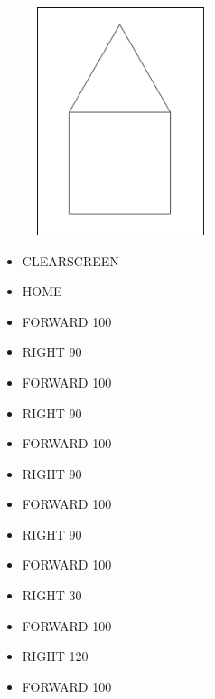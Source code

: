 \begin{minipage}{0.5\textwidth}
\begin{figure}[H]
   \includegraphics[width=5.0cm,trim=4 4 8 4,clip]{./images/marta/mar-1.png}
   \label{mar-1}
\end{figure}
\end{minipage} \hfill
\begin{minipage}{0.45\textwidth}
\begin{itemize}[itemsep=-3pt,parsep=2pt]
\item[] \hspace{0.5cm} CLEARSCREEN
\item[] \hspace{0.5cm} HOME 
\item[] \hspace{0.5cm} FORWARD 100
\item[] \hspace{0.5cm} RIGHT 90
\item[] \hspace{0.5cm} FORWARD 100
\item[] \hspace{0.5cm} RIGHT 90
\item[] \hspace{0.5cm} FORWARD 100
\item[] \hspace{0.5cm} RIGHT 90
\item[] \hspace{0.5cm} FORWARD 100
\item[] \hspace{0.5cm} RIGHT 90
\item[] \hspace{0.5cm} FORWARD 100
\item[] \hspace{0.5cm} RIGHT 30
\item[] \hspace{0.5cm} FORWARD 100
\item[] \hspace{0.5cm} RIGHT 120
\item[] \hspace{0.5cm} FORWARD 100
\end{itemize}
\end{minipage}

